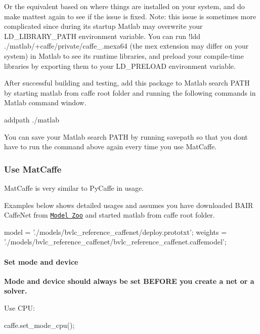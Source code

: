 Or the equivalent based on where things are installed on your system, and do {\ttfamily make mattest} again to see if the issue is fixed. Note\+: this issue is sometimes more complicated since during its startup Matlab may overwrite your {\ttfamily L\+D\+\_\+\+L\+I\+B\+R\+A\+R\+Y\+\_\+\+P\+A\+TH} environment variable. You can run {\ttfamily !ldd ./matlab/+caffe/private/caffe\+\_\+.mexa64} (the mex extension may differ on your system) in Matlab to see its runtime libraries, and preload your compile-\/time libraries by exporting them to your {\ttfamily L\+D\+\_\+\+P\+R\+E\+L\+O\+AD} environment variable.

After successful building and testing, add this package to Matlab search P\+A\+TH by starting {\ttfamily matlab} from caffe root folder and running the following commands in Matlab command window. \begin{DoxyVerb}addpath ./matlab
\end{DoxyVerb}


You can save your Matlab search P\+A\+TH by running {\ttfamily savepath} so that you don\textquotesingle{}t have to run the command above again every time you use Mat\+Caffe.

\subsubsection*{Use Mat\+Caffe}

Mat\+Caffe is very similar to Py\+Caffe in usage.

Examples below shows detailed usages and assumes you have downloaded B\+A\+IR Caffe\+Net from \href{http://caffe.berkeleyvision.org/model_zoo.html}{\tt Model Zoo} and started {\ttfamily matlab} from caffe root folder. \begin{DoxyVerb}model = './models/bvlc_reference_caffenet/deploy.prototxt';
weights = './models/bvlc_reference_caffenet/bvlc_reference_caffenet.caffemodel';
\end{DoxyVerb}


\paragraph*{Set mode and device}

{\bfseries Mode and device should always be set B\+E\+F\+O\+RE you create a net or a solver.}

Use C\+PU\+: \begin{DoxyVerb}caffe.set_mode_cpu();
\end{DoxyVerb}


